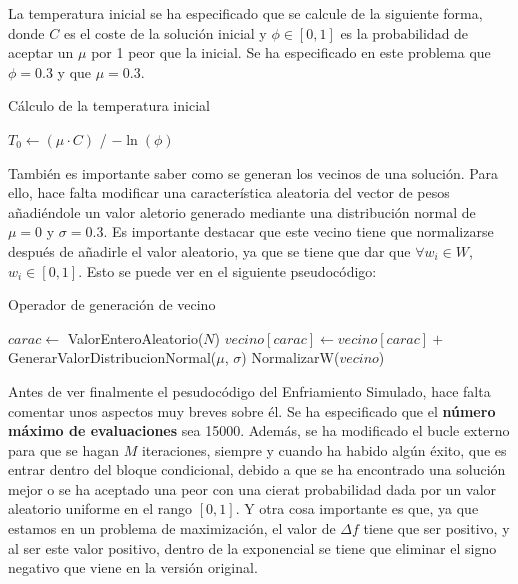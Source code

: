 \documentclass[11pt,a4paper]{article}
\begin{document}
La temperatura inicial se ha especificado que se calcule de la siguiente forma, donde $C$ es el coste de la solución inicial y
$\phi \in [0, 1]$ es la probabilidad de aceptar un $\mu$ por 1 peor que la inicial. Se ha especificado en este problema que
$\phi = 0.3$ y que $\mu = 0.3$.

\begin{algorithm}[H]
\caption{Cálculo de la temperatura inicial}
\begin{algorithmic}[1]
\State $T_0 \gets (\mu \cdot C)$ / $-\ln (\phi)$
\State {}
\EndFunction
\end{algorithmic}
\end{algorithm}

También es importante saber como se generan los vecinos de una solución. Para ello, hace falta modificar una característica
aleatoria del vector de pesos añadiéndole un valor aletorio generado mediante una distribución normal de $\mu = 0$ y $\sigma = 0.3$.
Es importante destacar que este vecino tiene que normalizarse después de añadirle el valor aleatorio, ya que se tiene que dar que
$\forall w_i \in W$, $w_i \in [0, 1]$. Esto se puede ver en el siguiente pseudocódigo:

\begin{algorithm}[H]
\caption{Operador de generación de vecino}
\begin{algorithmic}[1]
\State $carac \gets$ ValorEnteroAleatorio($N$)
\State $vecino[carac] \gets vecino[carac] + $ GenerarValorDistribucionNormal($\mu$, $\sigma$)
\State NormalizarW($vecino$)
\State {}
\EndFunction
\end{algorithmic}
\end{algorithm}

Antes de ver finalmente el pesudocódigo del Enfriamiento Simulado, hace falta comentar unos aspectos muy breves sobre él. Se ha
especificado que el \textbf{número máximo de evaluaciones} sea 15000. Además, se ha modificado el bucle externo para que se hagan
$M$ iteraciones, siempre y cuando ha habido algún éxito, que es entrar dentro del bloque condicional, debido a que se ha encontrado
una solución mejor o se ha aceptado una peor con una cierat probabilidad dada por un valor aleatorio uniforme en el rango $[0, 1]$.
Y otra cosa importante es que, ya que estamos en un problema de maximización, el valor de $\Delta f$ tiene que ser positivo, y
al ser este valor positivo, dentro de la exponencial se tiene que eliminar el signo negativo que viene en la versión original.
\end{document}
